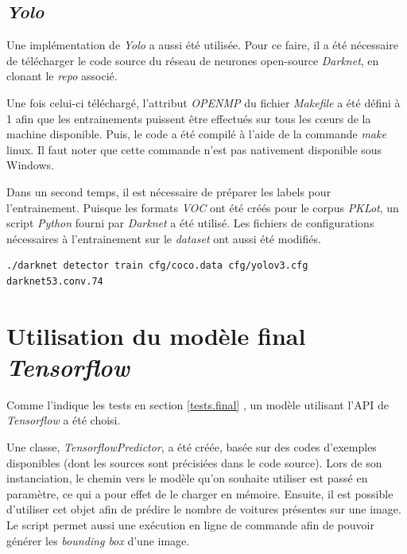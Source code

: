 \subsection{\textit{Yolo}}
Une implémentation de \textit{Yolo} a aussi été utilisée. Pour ce faire, il a été nécessaire de télécharger le code source du réseau de neurones open-source \textit{Darknet}\autocite{lib:yolo}, en clonant le \textit{repo} associé.

Une fois celui-ci téléchargé, l'attribut \textit{OPENMP} du fichier \textit{Makefile} a été défini à 1 afin que les entrainements puissent être effectués sur tous les cœurs de la machine disponible. Puis, le code a été compilé à l'aide de la commande \textit{make} linux. Il faut noter que cette commande n'est pas nativement disponible sous Windows.

Dans un second temps, il est nécessaire de préparer les labels pour l'entrainement. Puisque les formats \textit{VOC} ont été créés pour le corpus \textit{PKLot}, un script \textit{Python} fourni par \textit{Darknet} a été utilisé. Les fichiers de configurations nécessaires à l'entrainement sur le \textit{dataset} ont aussi été modifiés. 

\begin{lstlisting}[caption={Exécution d'un entrainement à l'aide de \textit{Yolo}}, label={lst:yolo_train}, numbers=none] 
./darknet detector train cfg/coco.data cfg/yolov3.cfg darknet53.conv.74
\end{lstlisting}


\section{Utilisation du modèle final \textit{Tensorflow}} 
Comme l'indique les tests en section \ref{tests.final} , un modèle utilisant l'API de \textit{Tensorflow} a été choisi. 

Une classe, \textit{TensorflowPredictor}, a été créée, basée sur des codes d'exemples disponibles (dont les sources sont précisiées dans le code source). Lors de son instanciation, le chemin vers le modèle qu'on souhaite utiliser est passé en paramètre, ce qui a pour effet de le charger en mémoire. Ensuite, il est possible d'utiliser cet objet afin de prédire le nombre de voitures présentes sur une image. Le script permet aussi une exécution en ligne de commande afin de pouvoir générer les \textit{bounding box} d'une image.